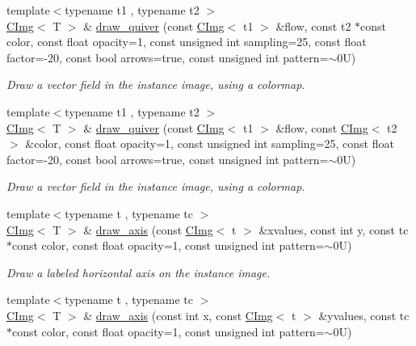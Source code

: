 \begin{DoxyCompactItemize}
\item 
{\footnotesize template$<$typename t1 , typename t2 $>$ }\\\hyperlink{structcimg__library_1_1CImg}{CImg}$<$ T $>$ \& \hyperlink{structcimg__library_1_1CImg_a034c4fba70d2bd5b44caf3445f8df706}{draw\_\-quiver} (const \hyperlink{structcimg__library_1_1CImg}{CImg}$<$ t1 $>$ \&flow, const t2 $\ast$const color, const float opacity=1, const unsigned int sampling=25, const float factor=-\/20, const bool arrows=true, const unsigned int pattern=$\sim$0U)
\begin{DoxyCompactList}\small\item\em Draw a vector field in the instance image, using a colormap. \item\end{DoxyCompactList}\item 
{\footnotesize template$<$typename t1 , typename t2 $>$ }\\\hyperlink{structcimg__library_1_1CImg}{CImg}$<$ T $>$ \& \hyperlink{structcimg__library_1_1CImg_a0c45c74524d81ae3e8dcc5568dc3ab46}{draw\_\-quiver} (const \hyperlink{structcimg__library_1_1CImg}{CImg}$<$ t1 $>$ \&flow, const \hyperlink{structcimg__library_1_1CImg}{CImg}$<$ t2 $>$ \&color, const float opacity=1, const unsigned int sampling=25, const float factor=-\/20, const bool arrows=true, const unsigned int pattern=$\sim$0U)
\begin{DoxyCompactList}\small\item\em Draw a vector field in the instance image, using a colormap. \item\end{DoxyCompactList}\item 
{\footnotesize template$<$typename t , typename tc $>$ }\\\hyperlink{structcimg__library_1_1CImg}{CImg}$<$ T $>$ \& \hyperlink{structcimg__library_1_1CImg_a08296af30d35f7d21b5609a674b9b49c}{draw\_\-axis} (const \hyperlink{structcimg__library_1_1CImg}{CImg}$<$ t $>$ \&xvalues, const int y, const tc $\ast$const color, const float opacity=1, const unsigned int pattern=$\sim$0U)
\begin{DoxyCompactList}\small\item\em Draw a labeled horizontal axis on the instance image. \item\end{DoxyCompactList}\item 
\hypertarget{structcimg__library_1_1CImg_a8bfff0993bc0ed0aa6a20cb9f8c63c28}{
{\footnotesize template$<$typename t , typename tc $>$ }\\\hyperlink{structcimg__library_1_1CImg}{CImg}$<$ T $>$ \& \hyperlink{structcimg__library_1_1CImg_a8bfff0993bc0ed0aa6a20cb9f8c63c28}{draw\_\-axis} (const int x, const \hyperlink{structcimg__library_1_1CImg}{CImg}$<$ t $>$ \&yvalues, const tc $\ast$const color, const float opacity=1, const unsigned int pattern=$\sim$0U)}
\label{structcimg__library_1_1CImg_a8bfff0993bc0ed0aa6a20cb9f8c63c28}


\end{DoxyCompactItemize}
